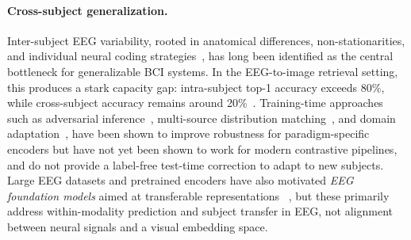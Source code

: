 \documentclass{article}
\begin{document}
\paragraph{Cross-subject generalization.}
Inter-subject EEG variability, rooted in anatomical differences, non-stationarities, and individual
neural coding strategies~\cite{jayaram2016transfer,lotte2018review,samek2013transferring,onton2006imaging}, has
long been identified as the central bottleneck for generalizable BCI systems.
In the EEG-to-image retrieval setting, this produces a stark capacity gap: intra-subject top-1 accuracy exceeds 80\%, while cross-subject accuracy remains around 20\%~\cite{du2025shallow,zhang2025neurobridge}.
Training-time approaches such as adversarial inference~\cite{ozdenizci2020adversarial}, multi-source
distribution matching~\cite{chen2021msmda,she2023multisource}, and domain
adaptation~\cite{zhao2021plugandplay}, have been shown to improve robustness for paradigm-specific encoders but have not yet been shown to work for modern contrastive pipelines, and do not provide a label-free test-time correction to adapt to new subjects.
Large EEG datasets and pretrained encoders have also motivated \emph{EEG foundation models} aimed at transferable representations ~\cite{elouahidi2025reve, cui2023neurogpt}, but these primarily address within-modality prediction and subject transfer in EEG, not alignment between neural signals and a visual embedding space.
\end{document}
